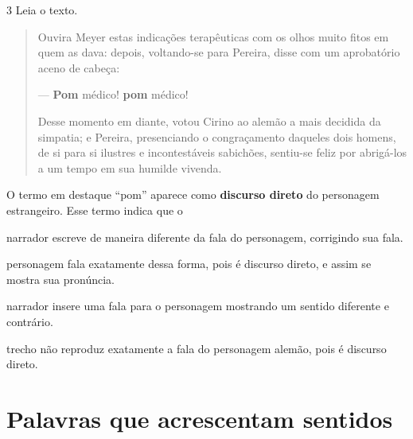 \num{3} Leia o texto.

\begin{quote}
Ouvira Meyer estas indicações terapêuticas com os olhos muito fitos em
quem as dava: depois, voltando-se para Pereira, disse com um aprobatório
aceno de cabeça:

— \textbf{Pom} médico! \textbf{pom} médico!

Desse momento em diante, votou Cirino ao alemão a mais decidida da
simpatia; e Pereira, presenciando o congraçamento daqueles dois homens,
de si para si ilustres e incontestáveis sabichões, sentiu-se feliz por
abrigá-los a um tempo em sua humilde vivenda.

\end{quote}

\noindent{}O termo em destaque “pom” aparece como \textbf{discurso direto} do
personagem estrangeiro. Esse termo indica que o

\begin{escolha}
\item narrador escreve de maneira diferente da fala do personagem,
corrigindo sua fala.

\item personagem fala exatamente dessa forma, pois é discurso direto,
e assim se mostra sua pronúncia.

\item narrador insere uma fala para o personagem mostrando um sentido
diferente e contrário.

\item trecho não reproduz exatamente a fala do personagem alemão,
pois é discurso direto.
\end{escolha}


\chapter{Palavras que acrescentam sentidos}



